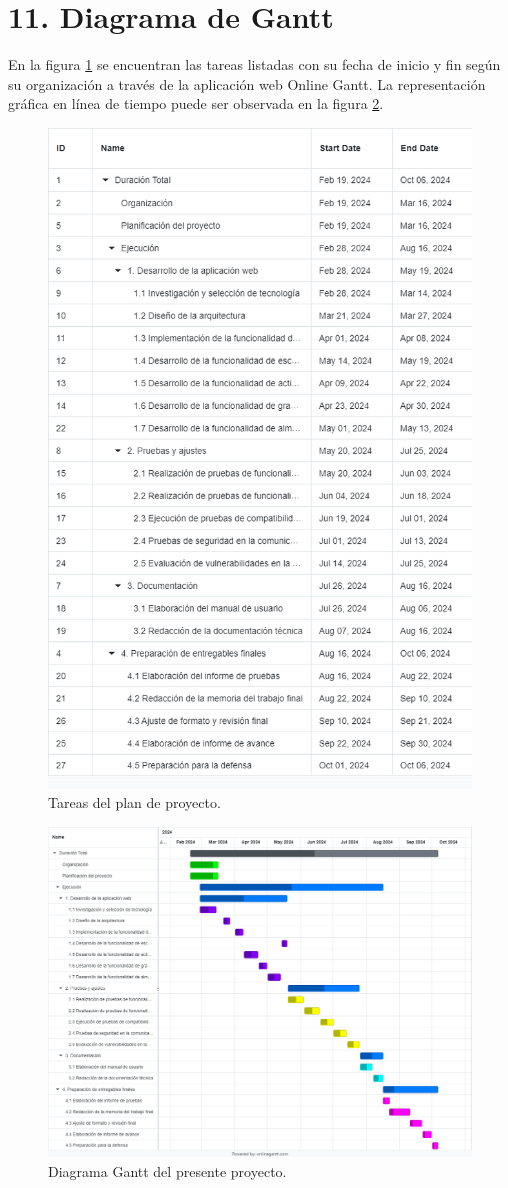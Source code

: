 \documentclass[
11pt, %
codirector, %
]{charter}
\begin{document}
\section{11. Diagrama de Gantt}
\label{sec:gantt}
En la figura \ref{fig:Tasks} se encuentran las tareas listadas con su fecha de inicio y fin según su organización a través de la aplicación web Online Gantt. La representación gráfica en línea de tiempo puede ser observada en la figura \ref{fig:Gantt}.
\begin{figure}[htpb]
\centering 
\includegraphics[width=.73\textwidth]{./Figuras/tasks.png}
\caption{Tareas del plan de proyecto.}
\label{fig:Tasks}
\end{figure}

\begin{figure}[htpb]
    \centering 
    \includegraphics[width=1\textwidth]{./Figuras/gantt_.png}
    \caption{Diagrama Gantt del presente proyecto.}
    \label{fig:Gantt}
\end{figure}
\end{document}
